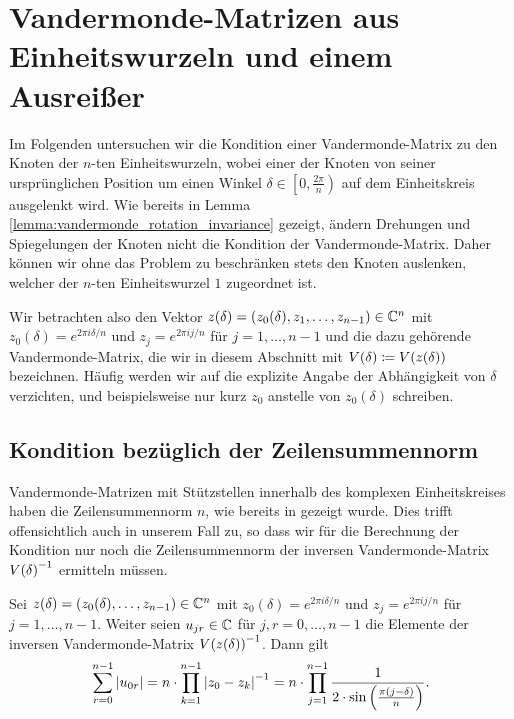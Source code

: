 \section{Vandermonde-Matrizen aus  Einheitswurzeln und einem Ausreißer}

Im Folgenden untersuchen wir die Kondition einer Vandermonde-Matrix zu den
Knoten der $n$-ten Einheitswurzeln, wobei einer der Knoten von seiner
ursprünglichen Position um einen Winkel $\delta \in \left[0,\frac{2
\pi}{n}\right)$ auf dem Einheitskreis ausgelenkt wird.
Wie bereits in Lemma \ref{lemma:vandermonde_rotation_invariance} gezeigt,
ändern Drehungen und Spiegelungen der Knoten nicht die Kondition der
Vandermonde-Matrix.
Daher können wir ohne das Problem zu beschränken stets den Knoten auslenken,
welcher der $n$-ten Einheitswurzel $1$ zugeordnet ist.

Wir betrachten also den Vektor $z(\delta) = (z_0(\delta), z_1, \dots, z_{n-1}) \in \mathbb{C}^n$ mit
$z_0(\delta) = e^{2 \pi i \delta / n}$
und
$z_j = e^{2 \pi i j / n}$ für $j = 1, \dots, n-1$
und die dazu gehörende Vandermonde-Matrix, die wir in diesem Abschnitt
mit $V \! \left( \delta \right) \coloneqq V \! \left( z(\delta) \right)$ bezeichnen.
Häufig werden wir auf die explizite Angabe der Abhängigkeit von $\delta$
verzichten, und beispielsweise nur kurz $z_0$ anstelle von $z_0(\delta)$
schreiben.

\subsection{Kondition bezüglich der Zeilensummennorm}

Vandermonde-Matrizen mit Stützstellen innerhalb des komplexen Einheitskreises
haben die Zeilensummennorm $n$, wie bereits in
 gezeigt wurde.
Dies trifft offensichtlich auch in unserem Fall zu, so dass wir für die
Berechnung der Kondition nur noch die Zeilensummennorm der inversen
Vandermonde-Matrix $V \! \left( \delta \right)^{-1}$ ermitteln müssen.

\begin{lemma}
    \label{lemma:inverse_outlier_vandermonde_first_row_abs_sum}
    Sei $z(\delta) = (z_0(\delta), \dots, z_{n-1}) \in \mathbb{C}^n$ mit
    $z_0(\delta) = e^{2 \pi i \delta / n}$
    und
    $z_j = e^{2 \pi i j / n}$ für $j = 1, \dots, n-1$.
    Weiter seien $u_{jr} \in \mathbb{C}$ für $j,r = 0,\dots,n-1$ die Elemente der
    inversen Vandermonde-Matrix $V \! \left( z(\delta) \right)^{-1}$.
    Dann gilt
    \[
        \sum_{r=0}^{n-1} \left\lvert  u_{0r}  \right\rvert
        = n \cdot \prod_{k=1}^{n-1} \left\lvert z_0 - z_k \right\rvert^{-1}
        = n \cdot \prod_{j=1}^{n-1} \frac{1}{2 \cdot \sin \left(\frac{\pi (j - \delta)}{n} \right)}.
    \]
\end{lemma}

